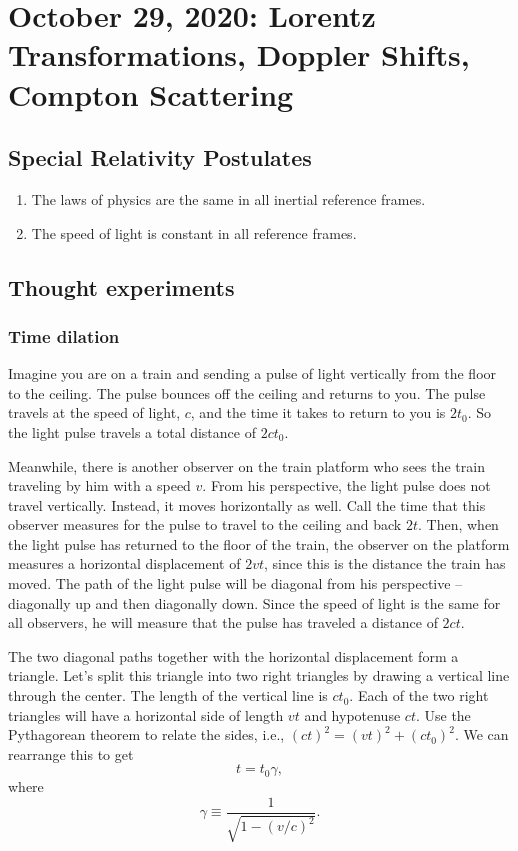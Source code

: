 \documentclass{article}
\begin{document}
\section{October 29, 2020: Lorentz Transformations, Doppler Shifts, Compton Scattering}

\subsection*{Special Relativity Postulates}

\begin{enumerate}
\item The laws of physics are the same in all inertial reference frames.
\item The speed of light is constant in all reference frames.
\end{enumerate}

\subsection*{Thought experiments}

\subsubsection*{Time dilation}

Imagine you are on a train and sending a pulse of light vertically from the floor to the ceiling. The pulse bounces off the ceiling and returns to you. The pulse travels at the speed of light, $c$, and the time it takes to return to you is $ 2 t_0 $. So the light pulse travels a total distance of $ 2 c t_0 $.

Meanwhile, there is another observer on the train platform who sees the train traveling by him with a speed $ v $. From his perspective, the light pulse does not travel vertically. Instead, it moves horizontally as well. Call the time that this observer measures for the pulse to travel to the ceiling and back $ 2 t $. Then, when the light pulse has returned to the floor of the train, the observer on the platform measures a horizontal displacement of $ 2 v t $, since this is the distance the train has moved. The path of the light pulse will be diagonal from his perspective -- diagonally up and then diagonally down. Since the speed of light is the same for all observers, he will measure that the pulse has traveled a distance of $ 2 c t $. 

The two diagonal paths together with the horizontal displacement form a triangle. Let's split this triangle into two right triangles by drawing a vertical line through the center. The length of the vertical line is $ c t_0 $. Each of the two right triangles will have a horizontal side of length $ v t $ and hypotenuse $ c t $. Use the Pythagorean theorem to relate the sides, i.e., $(c t)^2 = (v t)^2 + (c t_0)^2 $. We can rearrange this to get \begin{equation} t = t_0 \gamma , \end{equation} where \begin{equation} \gamma \equiv \frac{1}{\sqrt{1 - (v/c)^2}} . \end{equation}
\end{document}
